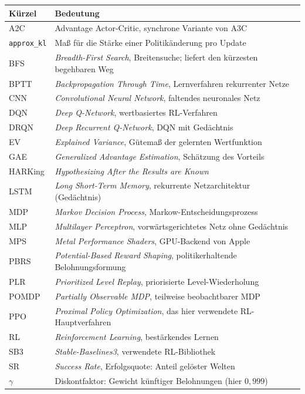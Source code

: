 \documentclass[11pt,a4paper]{article}
\begin{document}
\begin{longtable}{@{}ll@{}}
\toprule
\textbf{Kürzel} & \textbf{Bedeutung} \\
\midrule
\endhead
A2C   & Advantage Actor-Critic, synchrone Variante von A3C \\
\texttt{approx\_kl} & Maß für die Stärke einer Politikänderung pro Update \\
BFS   & \emph{Breadth-First Search}, Breitensuche; liefert den kürzesten begehbaren Weg \\
BPTT  & \emph{Backpropagation Through Time}, Lernverfahren rekurrenter Netze \\
CNN   & \emph{Convolutional Neural Network}, faltendes neuronales Netz \\
DQN   & \emph{Deep Q-Network}, wertbasiertes RL-Verfahren \\
DRQN  & \emph{Deep Recurrent Q-Network}, DQN mit Gedächtnis \\
EV    & \emph{Explained Variance}, Gütemaß der gelernten Wertfunktion \\
GAE   & \emph{Generalized Advantage Estimation}, Schätzung des Vorteils \\
HARKing & \emph{Hypothesizing After the Results are Known} \\
LSTM  & \emph{Long Short-Term Memory}, rekurrente Netzarchitektur (Gedächtnis) \\
MDP   & \emph{Markov Decision Process}, Markow-Entscheidungsprozess \\
MLP   & \emph{Multilayer Perceptron}, vorwärtsgerichtetes Netz ohne Gedächtnis \\
MPS   & \emph{Metal Performance Shaders}, GPU-Backend von Apple \\
PBRS  & \emph{Potential-Based Reward Shaping}, politikerhaltende Belohnungsformung \\
PLR   & \emph{Prioritized Level Replay}, priorisierte Level-Wiederholung \\
POMDP & \emph{Partially Observable MDP}, teilweise beobachtbarer MDP \\
PPO   & \emph{Proximal Policy Optimization}, das hier verwendete RL-Hauptverfahren \\
RL    & \emph{Reinforcement Learning}, bestärkendes Lernen \\
SB3   & \emph{Stable-Baselines3}, verwendete RL-Bibliothek \\
SR    & \emph{Success Rate}, Erfolgsquote: Anteil gelöster Welten \\
\midrule
$\gamma$      & Diskontfaktor: Gewicht künftiger Belohnungen (hier $0{,}999$) \\

\end{longtable}
\end{document}

